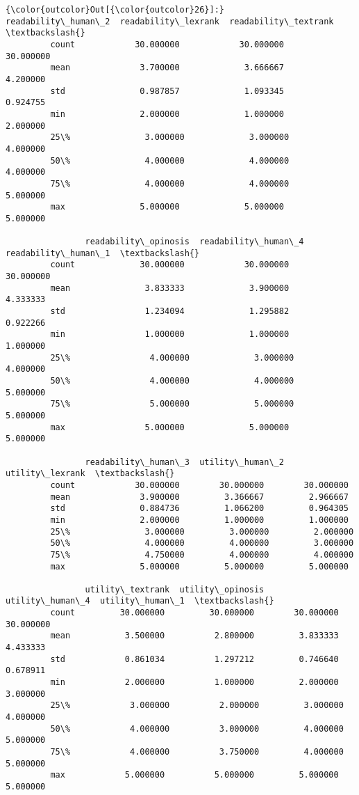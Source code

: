 \documentclass[11pt]{article}
\begin{document}
\begin{Verbatim}[commandchars=\\\{\}]
{\color{outcolor}Out[{\color{outcolor}26}]:}        readability\_human\_2  readability\_lexrank  readability\_textrank  \textbackslash{}
         count            30.000000            30.000000             30.000000   
         mean              3.700000             3.666667              4.200000   
         std               0.987857             1.093345              0.924755   
         min               2.000000             1.000000              2.000000   
         25\%               3.000000             3.000000              4.000000   
         50\%               4.000000             4.000000              4.000000   
         75\%               4.000000             4.000000              5.000000   
         max               5.000000             5.000000              5.000000   
         
                readability\_opinosis  readability\_human\_4  readability\_human\_1  \textbackslash{}
         count             30.000000            30.000000            30.000000   
         mean               3.833333             3.900000             4.333333   
         std                1.234094             1.295882             0.922266   
         min                1.000000             1.000000             1.000000   
         25\%                4.000000             3.000000             4.000000   
         50\%                4.000000             4.000000             5.000000   
         75\%                5.000000             5.000000             5.000000   
         max                5.000000             5.000000             5.000000   
         
                readability\_human\_3  utility\_human\_2  utility\_lexrank  \textbackslash{}
         count            30.000000        30.000000        30.000000   
         mean              3.900000         3.366667         2.966667   
         std               0.884736         1.066200         0.964305   
         min               2.000000         1.000000         1.000000   
         25\%               3.000000         3.000000         2.000000   
         50\%               4.000000         4.000000         3.000000   
         75\%               4.750000         4.000000         4.000000   
         max               5.000000         5.000000         5.000000   
         
                utility\_textrank  utility\_opinosis  utility\_human\_4  utility\_human\_1  \textbackslash{}
         count         30.000000         30.000000        30.000000        30.000000   
         mean           3.500000          2.800000         3.833333         4.433333   
         std            0.861034          1.297212         0.746640         0.678911   
         min            2.000000          1.000000         2.000000         3.000000   
         25\%            3.000000          2.000000         3.000000         4.000000   
         50\%            4.000000          3.000000         4.000000         5.000000   
         75\%            4.000000          3.750000         4.000000         5.000000   
         max            5.000000          5.000000         5.000000         5.000000   
         

\end{Verbatim}
\end{document}
